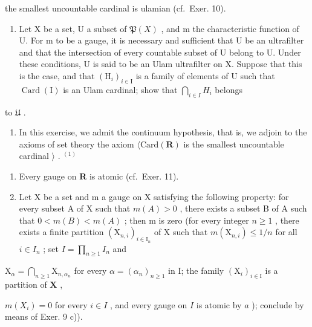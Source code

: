the smallest uncountable cardinal is ulamian (cf.~Exer. 10).

\begin{enumerate}
\def\labelenumi{\arabic{enumi})}
\setcounter{enumi}{11}
\tightlist
\item
  Let X be a set, U a subset of \(\mathfrak{P}(X)\) , and m the characteristic function of U. For m to be a gauge, it is necessary and sufficient that U be an ultrafilter and that the intersection of every countable subset of U belong to U. Under these conditions, U is said to be an Ulam ultrafilter on X. Suppose that this is the case, and that \((\mathrm{H}_{i})_{i\in\mathrm{I}}\) is a family of elements of U such that \(\operatorname{Card}(\mathrm{I})\) is an Ulam cardinal; show that \(\bigcap_{i\in I} H_{i}\) belongs
\end{enumerate}

to \(\mathfrak{U}\) .

\begin{enumerate}
\def\labelenumi{\arabic{enumi})}
\setcounter{enumi}{12}
\tightlist
\item
  In this exercise, we admit the continuum hypothesis, that is, we adjoin to the axioms of set theory the axiom \(\langle\mathrm{Card}(\mathbf{R})\) is the smallest uncountable cardinal \(\rangle\) . \(^{(1)}\)
\end{enumerate}

\begin{enumerate}
\def\labelenumi{\alph{enumi})}
\item
  Every gauge on \(\mathbf{R}\) is atomic (cf.~Exer. 11).
\item
  Let X be a set and m a gauge on X satisfying the following property: for every subset A of X such that \(m(A) > 0\) , there exists a subset B of A such that \(0 < m(B) < m(A)\) ; then m is zero (for every integer \(n \geqslant 1\) , there exists a finite partition \((\mathrm{X}_{n,i})_{i \in \mathrm{I}_n}\) of X such that \(m(\mathrm{X}_{n,i}) \leqslant 1/n\) for all \(i \in I_n\) ; set \(I = \prod_{n \geqslant 1} I_n\) and
\end{enumerate}

\(\mathrm{X}_{\alpha} = \bigcap_{n\geqslant 1}\mathrm{X}_{n,\alpha_n}\) for every \(\alpha = (\alpha_{n})_{n\geqslant 1}\) in I; the family \((\mathrm{X}_i)_{i\in \mathrm{I}}\) is a partition of \(\mathbf{X}\) ,

\(m(X_{i}) = 0\) for every \(i \in I\) , and every gauge on \(I\) is atomic by \(a\) ); conclude by means of Exer. 9 c)).


